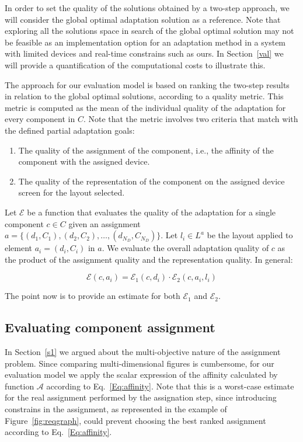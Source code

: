 In order to set the quality of the solutions obtained by a two-step approach, we will consider the global optimal adaptation solution as a reference. 
Note that exploring all the solutions space in search of the global optimal solution may not be feasible as an implementation option for an adaptation method in a system with limited devices and real-time constrains such as ours.
In Section~\ref{val} we will provide a quantification of the computational costs to illustrate this. 

The approach for our evaluation model is based on ranking the two-step results in relation to the global optimal solutions, according to a quality metric.
This metric is computed as the mean of the individual quality of the adaptation for every  component in $C$. 
Note that the metric involves two criteria that match with the defined partial adaptation goals:
\begin{enumerate}
	\item The quality of the assignment of the component, i.e., the affinity of the component with the assigned device.
	\item The quality of the representation of the component on the assigned device screen for the layout selected.
\end{enumerate}

Let $\mathcal{E}$ be a function that evaluates the quality of the adaptation for a single component $c \in C$ given an assignment $a=\{(d_1,C_1), (d_2,C_2), \ldots, (d_{N_D},C_{N_D})\}$. 
Let $l_i\in L^a$ be the layout applied to element $a_i=(d_i,C_i)$ in $a$. 
We evaluate the overall adaptation quality of $c$ as the product of the assignment quality and the representation quality.
In general:

\begin{equation} \label{Eq:E}
\mathcal{E}(c,a_i) = \mathcal{E}_1(c,d_i) \cdot \mathcal{E}_2(c,a_i,l_i)
\end{equation} 

The point now is to provide an estimate for both $\mathcal{E}_1$ and $\mathcal{E}_2$.

\subsection{Evaluating component assignment}

In Section~\ref{s1} we argued about the multi-objective nature of the assignment problem. 
Since comparing multi-dimensional figures is cumbersome, for our evaluation model we apply the scalar expression of the affinity calculated by function $\mathcal{A}$ according to Eq.~\ref{Eq:affinity}.
Note that this is a worst-case estimate for the real assignment performed by the assignation step, since introducing constrains in the assignment, as represented in the example of Figure~\ref{fig:reqgraph}, could prevent choosing the best ranked assignment according to Eq.~\ref{Eq:affinity}.

